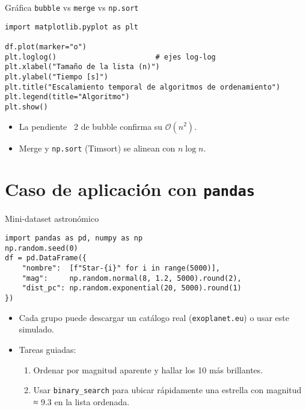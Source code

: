 \documentclass[10pt]{beamer}
\begin{document}
\begin{frame}[fragile]{Gráfica \texttt{bubble} vs \texttt{merge} vs \texttt{np.sort}}
\begin{verbatim}
import matplotlib.pyplot as plt

df.plot(marker="o")
plt.loglog()                       # ejes log-log
plt.xlabel("Tamaño de la lista (n)")
plt.ylabel("Tiempo [s]")
plt.title("Escalamiento temporal de algoritmos de ordenamiento")
plt.legend(title="Algoritmo")
plt.show()
\end{verbatim}
\vspace{-0.8em}
\begin{itemize}
  \item La pendiente ~2 de bubble confirma su \(\mathcal{O}(n^{2})\).
  \item Merge y \texttt{np.sort} (Timsort) se alinean con \(n\log n\).
\end{itemize}
\end{frame}

\section{Caso de aplicación con \texttt{pandas}}
\begin{frame}[fragile]{Mini-dataset astronómico}
\begin{verbatim}
import pandas as pd, numpy as np
np.random.seed(0)
df = pd.DataFrame({
    "nombre":  [f"Star-{i}" for i in range(5000)],
    "mag":     np.random.normal(8, 1.2, 5000).round(2),
    "dist_pc": np.random.exponential(20, 5000).round(1)
})
\end{verbatim}
\begin{itemize}
  \item Cada grupo puede descargar un catálogo real (\texttt{exoplanet.eu}) o usar este simulado.
  \item Tareas guiadas:
    \begin{enumerate}
      \item Ordenar por magnitud aparente y hallar los 10 más brillantes.
      \item Usar \texttt{binary\_search} para ubicar rápidamente una estrella con magnitud ≈ 9.3 en la lista ordenada.
    \end{enumerate}
\end{itemize}
\end{frame}
\end{document}
